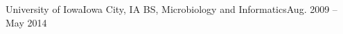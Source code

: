       \resumeSubheading
      {University of Iowa}{Iowa City, IA}
      {BS, Microbiology and Informatics}{Aug. 2009 -- May 2014}
      
      
      
   
   \resumeSubHeadingListEnd

%
%
%      
%


